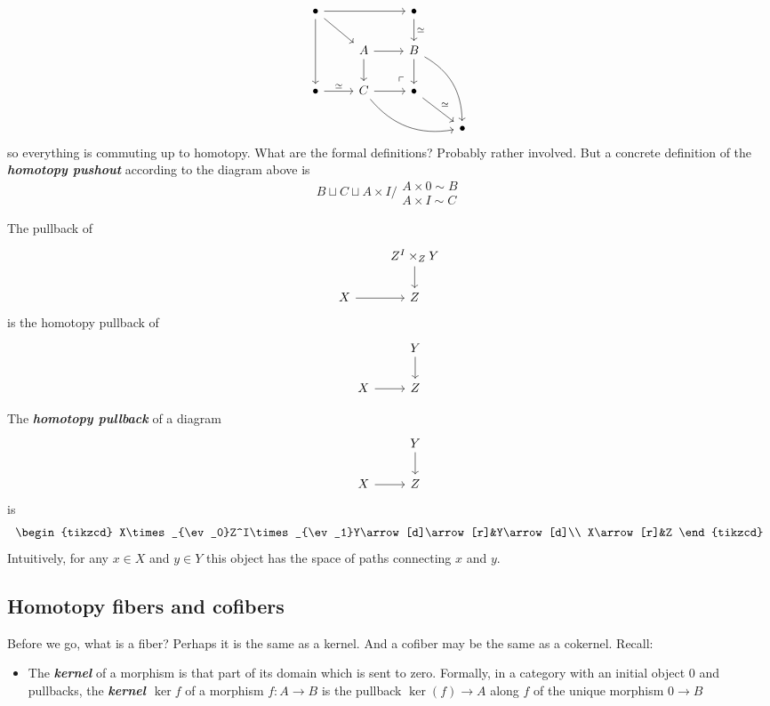 \begin{remark}
\begin{defn}
\begin{remark}
		\[\begin{tikzcd}
			\bullet\arrow[rr]\arrow[dd]\arrow[dr]&&\bullet\arrow[d,"\simeq "]\\
			&A\arrow[r]\arrow[d]&B\arrow[d]\arrow[ddr,bend left]\\
			\bullet\arrow[r,"\simeq "]&C\arrow[r]\arrow[drr,bend right]&\bullet\arrow[ul, phantom, "\ulcorner", very near start]\arrow[dr,"\simeq" ]\\
			&&&\bullet
		\end{tikzcd}\]
	so everything is commuting up to homotopy. {\color{magenta}What are the formal definitions? Probably rather involved.} But a concrete definition of the \textit{\textbf{homotopy pushout}} according to the diagram above is
	\[B\sqcup C\sqcup A\times I\Big/\substack{A\times 0\sim B \\ A\times I\sim C}\]
\end{remark}
\begin{remark}
		The pullback of
	\[\begin{tikzcd}
		&Z^I\times_ZY\arrow[d]\\
		X\arrow[r]&Z
	\end{tikzcd}\]
	is the homotopy pullback of
	\[\begin{tikzcd}
		&Y\arrow[d]\\
		X\arrow[r]&Z
	\end{tikzcd}\]
\end{remark}
\begin{defn}
	The \textbf{\textit{homotopy pullback}} of a diagram
		\[\begin{tikzcd}
			&Y\arrow[d]\\
			X\arrow[r]&Z
		\end{tikzcd}\]
		is
		\[\begin{tikzcd}
			X\times_{\ev_0}Z^I\times_{\ev_1}Y\arrow[d]\arrow[r]&Y\arrow[d]\\
			X\arrow[r]&Z
		\end{tikzcd}\]
		Intuitively, for any $x\in X$ and $y\in Y$ this object has the space of paths connecting $x$ and $y$.
\end{defn}

\subsection{Homotopy fibers and cofibers}

Before we go, what is a fiber? Perhaps it is the same as a kernel. And a cofiber may be the same as a cokernel. Recall:
\begin{defn}\leavevmode 
	\begin{itemize}
		\item The \textbf{\textit{kernel}} of a morphism is that part of its domain which is sent to zero. Formally, in a category with an initial object 0 and pullbacks, the \textbf{\textit{kernel $\ker f$}} of a morphism $f:A\to B$ is the pullback $\ker(f)\to A$ along $f$ of the unique morphism $0\to B$
		

\end{itemize}
\end{defn}
\end{defn}
\end{remark}
